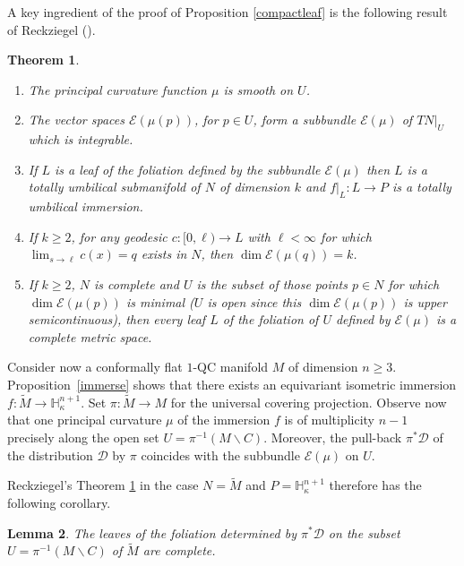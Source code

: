 \documentclass[JEP,XML,SOM,Unicode]{cedram}
\let\mathcal\mathscr
\let\moins\smallsetminus
\newtheorem{theorem}{Theorem}[section]
\newtheorem{lemma}[theorem]{Lemma}
\theoremstyle{definition}
\theoremstyle{remark}
\numberwithin{equation}{section}
\begin{document}
A key ingredient of the proof of Proposition \ref{compactleaf} is the following result of Reckziegel (\cite[Th.\,1.1, Rem.\,1,\,2]{Re}).

\skpt
\begin{theorem}\label{Reckziegel}
\begin{enumerate}
\item The principal curvature function $\mu$ is smooth on $U$.
\item The vector spaces $\mathcal E(\mu(p))$, for $p\in U$, form a subbundle $\mathcal E(\mu)$ of $TN|_U$ which is integrable.
\item If $L$ is a leaf of the foliation defined by the subbundle $\mathcal E(\mu)$ then $L$ is a totally umbilical submanifold of $N$ of dimension $k$ and
$f|_L: L\to P$ is a totally umbilical immersion.
\item If $k\geq 2$,
for any geodesic $c:[0,\ell) \to L$ with $\ell\!<\!\infty$ for which \hbox{$\lim_{s \to \ell} c(x)\!=\!q$} exists in $N$, then $\dim \mathcal E(\mu(q))=k$.
\item If $k\geq 2$, $N$ is complete and $U$ is the subset of those points $p\in N$ for which $\dim \mathcal E(\mu(p))$ is minimal
($U$ is open since this $\dim \mathcal E(\mu(p))$ is upper semicontinuous), then
every leaf $L$ of the foliation of $U$ defined by $\mathcal E(\mu)$ is a complete metric space.
\end{enumerate}
\end{theorem}

Consider now a conformally flat $1$-QC manifold $M$ of dimension $n\geq3$.
Proposition~\ref{immerse} shows that there exists an equivariant isometric immersion
$f: \widetilde{M}\to \mathbb H_{\kappa}^{n+1}$. Set $\pi:\widetilde{M}\to M$ for the universal covering projection.
Observe now that one principal curvature $\mu$ of the immersion $f$ is of multiplicity $n-1$
precisely along the open set $U=\pi^{-1}(M\moins C)$. Moreover, the pull-back $\pi^{*}\mathcal D$ of the distribution $\mathcal D$
by $\pi$ coincides with the subbundle $\mathcal E(\mu)$ on $U$.

Reckziegel's Theorem \ref{Reckziegel} in the case
$N=\widetilde{M}$ and $P=\mathbb H_{\kappa}^{n+1}$ therefore has the following corollary.

\begin{lemma}\label{Reck}
The leaves of the foliation determined by $\pi^{*}\mathcal D$ on
the subset $U=\pi^{-1}(M\moins C)$ of $\widetilde{M}$ are complete.
\end{lemma}
\end{document}
